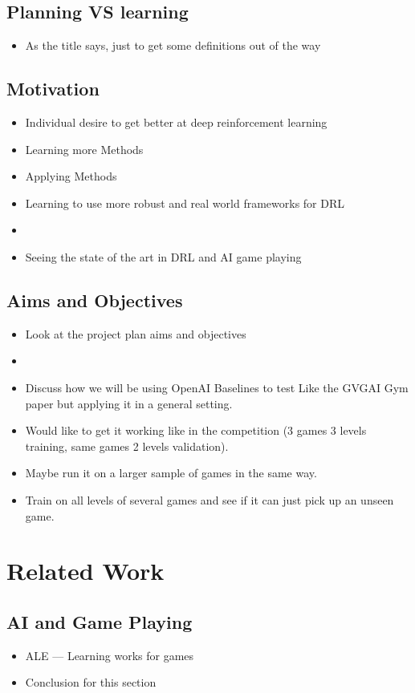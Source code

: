 \documentclass[a4paper]{article}
\begin{document}
\subsection{Planning VS learning}
\begin{itemize}
    \item As the title says, just to get some definitions out of the way
\end{itemize}
\subsection{Motivation}
\begin{itemize}
    \item Individual desire to get better at deep reinforcement learning
    \item Learning more Methods
    \item Applying Methods
    \item Learning to use more robust and real world frameworks for DRL
    \item
    \item Seeing the state of the art in DRL and AI game playing
\end{itemize}
\subsection{Aims and Objectives}
\begin{itemize}
    \item Look at the project plan aims and objectives
    \item
    \item Discuss how we will be using OpenAI Baselines to test
    Like the GVGAI Gym paper but applying it in a general setting.
    \item Would like to get it working like in the competition (3 games 3 levels training, same games 2 levels validation).
    \item Maybe run it on a larger sample of games in the same way.
    \item Train on all levels of several games and see if it can just pick up an unseen game.
\end{itemize}

\section{Related Work}
\subsection{AI and Game Playing}
\begin{itemize}
    \item ALE --- Learning works for games
    \item Conclusion for this section
\end{itemize}
\end{document}
